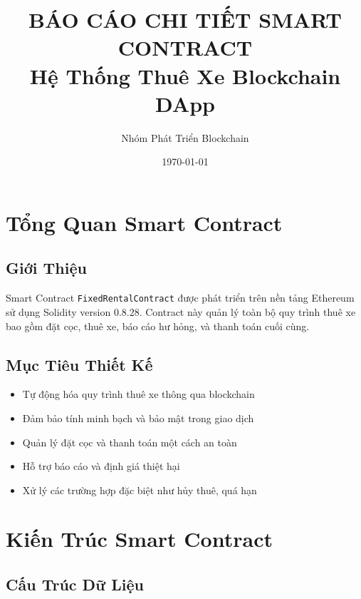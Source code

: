 \documentclass[12pt,a4paper]{article}
\title{\textbf{BÁO CÁO CHI TIẾT SMART CONTRACT}\\
\large Hệ Thống Thuê Xe Blockchain DApp}
\author{Nhóm Phát Triển Blockchain}
\date{\today}
\begin{document}
\maketitle
\newpage

\tableofcontents
\newpage

\section{Tổng Quan Smart Contract}

\subsection{Giới Thiệu}
Smart Contract \texttt{FixedRentalContract} được phát triển trên nền tảng Ethereum sử dụng Solidity version 0.8.28. Contract này quản lý toàn bộ quy trình thuê xe bao gồm đặt cọc, thuê xe, báo cáo hư hỏng, và thanh toán cuối cùng.

\subsection{Mục Tiêu Thiết Kế}
\begin{itemize}
\item Tự động hóa quy trình thuê xe thông qua blockchain
\item Đảm bảo tính minh bạch và bảo mật trong giao dịch
\item Quản lý đặt cọc và thanh toán một cách an toàn
\item Hỗ trợ báo cáo và định giá thiệt hại
\item Xử lý các trường hợp đặc biệt như hủy thuê, quá hạn
\end{itemize}

\section{Kiến Trúc Smart Contract}

\subsection{Cấu Trúc Dữ Liệu}
\end{document}
